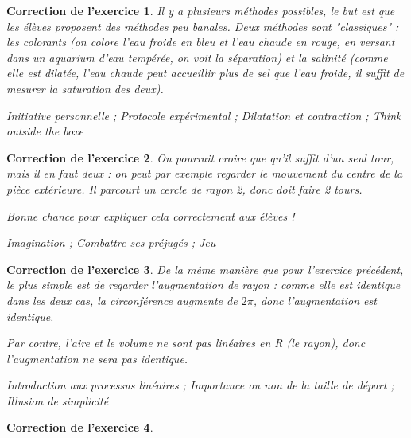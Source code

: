 \documentclass[12pt]{article}
\theoremstyle{break}
\newtheorem{cor}{Correction de l'exercice}
\begin{document}
\begin{cor}
Il y a plusieurs méthodes possibles, le but est que les élèves proposent des méthodes peu banales. Deux méthodes sont "classiques" : les colorants (on colore l'eau froide en bleu et l'eau chaude en rouge, en versant dans un aquarium d'eau tempérée, on voit la séparation) et la salinité (comme elle est dilatée, l'eau chaude peut accueillir plus de sel que l'eau froide, il suffit de mesurer la saturation des deux).

\textit{Initiative personnelle ; Protocole expérimental ; Dilatation et contraction ; Think outside the boxe}
\end{cor}


\begin{cor}
On pourrait croire que qu'il suffit d'un seul tour, mais il en faut deux : on peut par exemple regarder le mouvement du centre de la pièce extérieure. Il parcourt un cercle de rayon 2, donc doit faire 2 tours.

Bonne chance pour expliquer cela correctement aux élèves !

\textit{Imagination ; Combattre ses préjugés ; Jeu}
\end{cor}


\begin{cor}
De la même manière que pour l'exercice précédent, le plus simple est de regarder l'augmentation de rayon : comme elle est identique dans les deux cas, la circonférence augmente de $2\pi$, donc l'augmentation est identique.

Par contre, l'aire et le volume ne sont pas linéaires en R (le rayon), donc l'augmentation ne sera pas identique.

\textit{Introduction aux processus linéaires ; Importance ou non de la taille de départ ; Illusion de simplicité}
\end{cor}


\begin{cor}

\end{cor}
\end{document}
